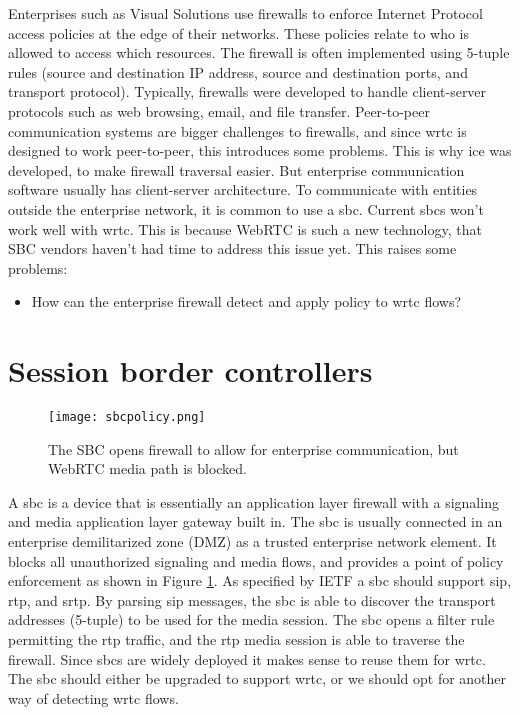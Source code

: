 Enterprises such as Visual Solutions use firewalls to enforce Internet Protocol access policies at the edge of their networks. These policies relate to who is allowed to access which resources. The firewall is often implemented using 5-tuple rules (source and destination IP address, source and destination ports, and transport protocol). Typically, firewalls were developed to handle client-server protocols such as web browsing, email, and file transfer\cite{johnston_taking_2013}. Peer-to-peer communication systems are bigger challenges to firewalls, and since \gls{wrtc} is designed to work peer-to-peer, this introduces some problems. This is why \gls{ice} was developed, to make firewall traversal easier. But enterprise communication software usually has client-server architecture. To communicate with entities outside the enterprise network, it is common to use a \gls{sbc}. Current \gls{sbc}s won't work well with \gls{wrtc}. This is because WebRTC is such a new technology, that SBC vendors haven't had time to address this issue yet. This raises some problems:

\begin{itemize}
\item{How can the enterprise firewall detect and apply policy to \gls{wrtc} flows?}
\end{itemize}

\section{Session border controllers}

\begin{figure}[here]
\centerline{\texttt{[image: sbcpolicy.png]}}
\caption{The SBC opens firewall to allow for enterprise communication, but WebRTC media path is blocked.}
\label{fig:sbc-policy}
\end{figure}

A \gls{sbc} is a device that is essentially an application layer firewall with a signaling and media application layer gateway built in. The \gls{sbc} is usually connected in an enterprise demilitarized zone (DMZ) as a trusted enterprise network element. It blocks all unauthorized signaling and media flows, and provides a point of policy enforcement as shown in Figure \ref{fig:sbc-policy}. As specified by IETF\cite{sbc} a \gls{sbc} should support \gls{sip}, \gls{rtp}, and \gls{srtp}. By parsing \gls{sip} messages, the \gls{sbc} is able to discover the transport addresses (5-tuple) to be used for the media session. The \gls{sbc} opens a filter rule permitting the \gls{rtp} traffic, and the \gls{rtp} media session is able to traverse the firewall. Since \gls{sbc}s are widely deployed it makes sense to reuse them for \gls{wrtc}. The \gls{sbc} should either be upgraded to support \gls{wrtc}, or we should opt for another way of detecting \gls{wrtc} flows.

